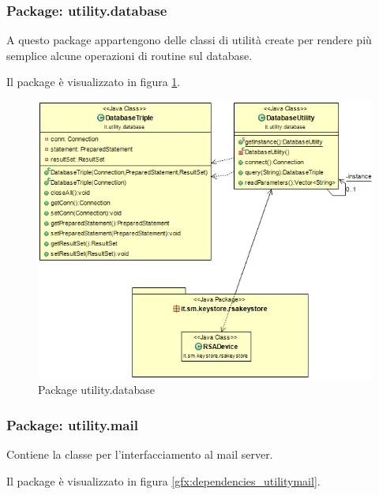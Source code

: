 \subsubsection{Package: \textbf{utility.database}}

A questo package appartengono delle classi di utilità create per rendere più semplice alcune operazioni di routine sul database.

Il package è visualizzato in figura \ref{gfx:dependencies_utilitydatabase}.

\begin{figure}[!htbp]
	\centering
	\includegraphics[scale = .5]{img/dependencies_utility_database}
	\caption{Package utility.database}
	\label{gfx:dependencies_utilitydatabase}
\end{figure}

\subsubsection{Package: \textbf{utility.mail}}

Contiene la classe per l’interfacciamento al mail server.

Il package è visualizzato in figura \ref{gfx:dependencies_utilitymail}.

